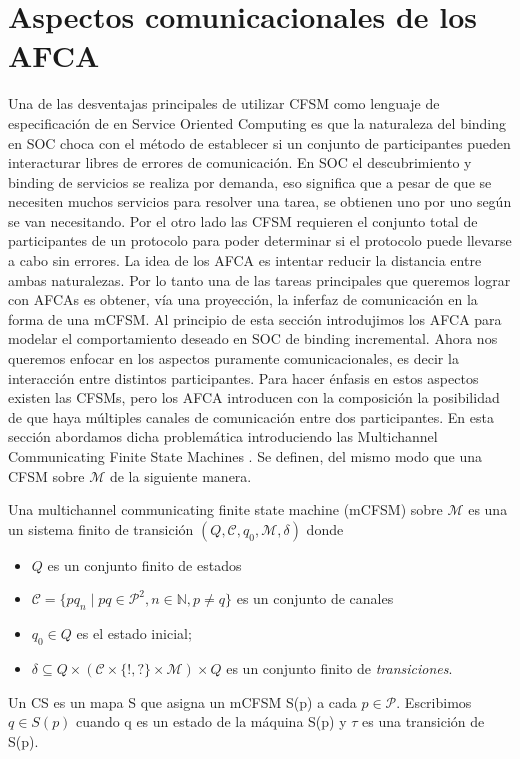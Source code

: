 \section{Aspectos comunicacionales de los AFCA}
Una de las desventajas principales de utilizar CFSM como lenguaje de especificación de en Service Oriented Computing es que la naturaleza del binding en SOC choca con el método de establecer si un conjunto de participantes pueden interacturar libres de errores de comunicación. En SOC el descubrimiento y binding de servicios se realiza por demanda, eso significa que a pesar de que se necesiten muchos servicios para resolver una tarea, se obtienen uno por uno según se van necesitando. Por el otro lado las CFSM requieren el conjunto total de participantes de un protocolo para poder determinar si el protocolo puede llevarse a cabo sin errores. La idea de los AFCA es intentar reducir la distancia entre ambas naturalezas. Por lo tanto una de las tareas principales que queremos lograr con AFCAs es obtener, vía una proyección, la inferfaz de comunicación en la forma de una mCFSM.
Al principio de esta sección introdujimos los AFCA para modelar el comportamiento deseado en SOC de binding incremental. Ahora nos queremos enfocar en los aspectos puramente comunicacionales, es decir la interacción entre distintos participantes. Para hacer énfasis en estos aspectos existen las CFSMs, pero los AFCA introducen con la composición la posibilidad de que haya múltiples canales de comunicación entre dos participantes. En esta sección abordamos dicha problemática introduciendo las Multichannel Communicating Finite State Machines \cite[Def.~82]{vissani:phdthesis}. Se definen, del mismo modo que una CFSM sobre $\mathcal{M}$ de la siguiente manera.

\begin{definition}\label{mCFSM} Una multichannel communicating finite state machine (mCFSM) sobre $\mathcal{M}$ es una un sistema finito de transición $(Q, \mathcal{C}, q_0, \mathcal{M}, \delta)$ donde
\begin{itemize}
  \item $Q$ es un conjunto finito de estados
  \item $\mathcal{C} = \{ pq_n \mid pq \in \mathcal{P}^2, n \in \mathbb{N}, p \not= q\}$ es un conjunto de canales
  \item $q_0 \in Q$ es el estado inicial;
  \item $\delta \subseteq Q \times (\mathcal{C} \times \{!,?\} \times \mathcal{M}) \times
    Q$ es un conjunto finito de \emph{transiciones}.
  \end{itemize}

Un CS es un mapa S que asigna un mCFSM S(p) a cada $p \in \mathcal{P}$. Escribimos $q \in S(p)$ cuando q es un estado de la máquina S(p) y $\tau$ es una transición de S(p).\end{definition}

